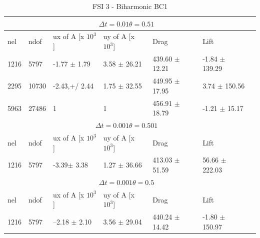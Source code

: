 \begin{table}[h!]
\centering
\caption{FSI 3 - Biharmonic BC1}
\label{my-label}
\begin{tabular}{ |p{1cm}||p{1cm}|p{2.5cm}|p{2.5cm}|p{2.7cm}|p{2.7cm}|p{1.2cm}|}
 \hline
  \multicolumn{6}{|c|}{$\Delta t = 0.01 \theta = 0.51$} \\
   \hline
nel & ndof & ux of A [x $10^{3}$]  &uy of A [x $10^{3}$]& Drag  & Lift \\
 \hline
1216 &5797& -1.77 $\pm$ 1.79  & 3.58 $\pm$  26.21& 439.60  $\pm$ 12.21  &  -1.84  $\pm$  139.29 \\
2295 &10730& -2.43,+/  2.44  & 1.75  $\pm$  32.55 & 449.95     $\pm$  17.95  &  3.74 $\pm$  150.56 \\
5963 &27486 & 1 & 1& 456.91  $\pm$  18.79 &  -1.21  $\pm$   15.17\\
 \hline
  \multicolumn{6}{|c|}{$\Delta t = 0.001 \theta = 0.501$} \\
   \hline
 nel & ndof & ux of A [x $10^{3}$]  &uy of A [x $10^{3}$]& Drag  & Lift \\
 1216 &5797& -3.39$\pm$  3.38 &  1.27 $\pm$  36.66  & 413.03  $\pm$  51.59 & 56.66  $\pm$  222.03 \\
\hline
\multicolumn{6}{|c|}{$\Delta t = 0.001 \theta = 0.5$} \\
   \hline
 nel & ndof & ux of A [x $10^{3}$]  &uy of A [x $10^{3}$]& Drag  & Lift \\
\hline
1216 &5797&--2.18  $\pm$ 2.10 &  3.56   $\pm$  29.04 & 440.24  $\pm$  14.42  & -1.80  $\pm$  150.97\\
\hline
\end{tabular}
\end{table}

